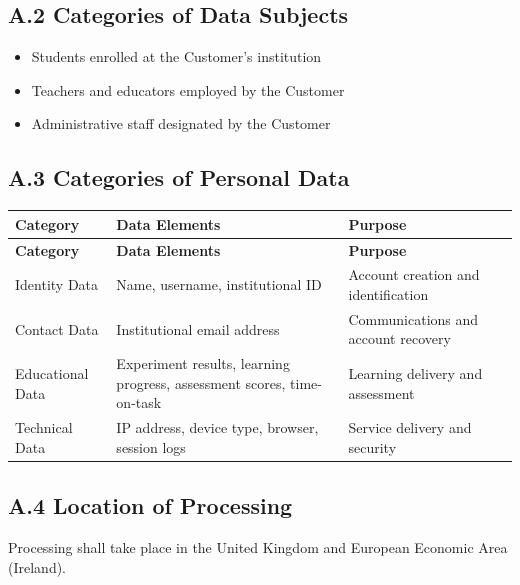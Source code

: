 \documentclass[11pt,a4paper]{article}
\begin{document}
\subsection*{A.2 Categories of Data Subjects}

\begin{itemize}
    \item Students enrolled at the Customer's institution
    \item Teachers and educators employed by the Customer
    \item Administrative staff designated by the Customer
\end{itemize}

\subsection*{A.3 Categories of Personal Data}

\begin{center}
\begin{longtable}{@{}>{\raggedright}p{3.5cm}>{\raggedright}p{5cm}>{\raggedright\arraybackslash}p{5cm}@{}}
\toprule
\textbf{Category} & \textbf{Data Elements} & \textbf{Purpose} \\
\midrule
\endfirsthead
\toprule
\textbf{Category} & \textbf{Data Elements} & \textbf{Purpose} \\
\midrule
\endhead
Identity Data & Name, username, institutional ID & Account creation and identification \\
\midrule
Contact Data & Institutional email address & Communications and account recovery \\
\midrule
Educational Data & Experiment results, learning progress, assessment scores, time-on-task & Learning delivery and assessment \\
\midrule
Technical Data & IP address, device type, browser, session logs & Service delivery and security \\
\bottomrule
\end{longtable}
\end{center}

\subsection*{A.4 Location of Processing}

Processing shall take place in the United Kingdom and European Economic Area (Ireland).

\newpage
\end{document}
